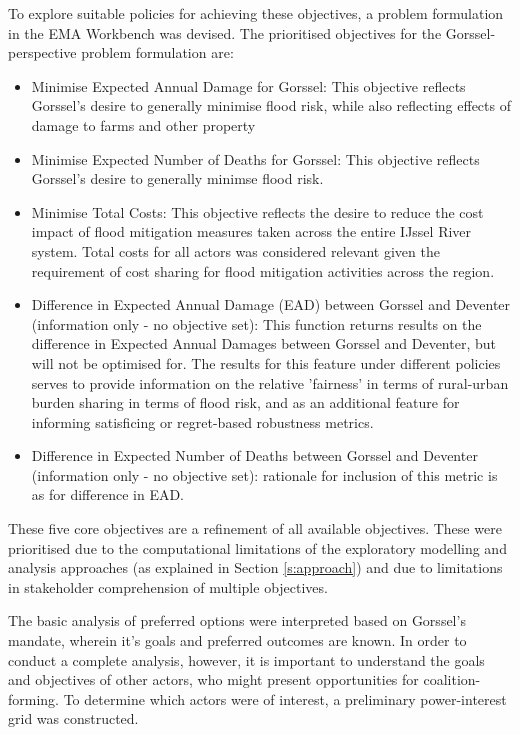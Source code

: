 To explore suitable policies for achieving these objectives, a problem formulation in the EMA Workbench was devised.
The prioritised objectives for the Gorssel-perspective problem formulation are:
\begin{itemize}
    \item Minimise Expected Annual Damage for Gorssel: This objective reflects Gorssel's desire to generally minimise flood risk, while also reflecting effects of damage to farms and other property
    \item Minimise Expected Number of Deaths for Gorssel: This objective reflects Gorssel's desire to generally minimse flood risk.
    \item Minimise Total Costs: This objective reflects the desire to reduce the cost impact of flood mitigation measures taken across the entire IJssel River system. Total costs for all actors was considered relevant given the requirement of cost sharing for flood mitigation activities across the region.
    \item Difference in Expected Annual Damage (EAD) between Gorssel and Deventer (information only - no objective set): This function returns results on the difference in Expected Annual Damages between Gorssel and Deventer, but will not be optimised for. The results for this feature under different policies serves to provide information on the relative 'fairness' in terms of rural-urban burden sharing in terms of flood risk, and as an additional feature for informing satisficing or regret-based robustness metrics.
    \item Difference in Expected Number of Deaths between Gorssel and Deventer (information only - no objective set): rationale for inclusion of this metric is as for difference in EAD.
\end{itemize}
These five core objectives are a refinement of all available objectives. These were prioritised due to the computational limitations of the exploratory modelling and analysis approaches (as explained in Section \ref{s:approach}) and due to limitations in stakeholder comprehension of multiple objectives.


The basic analysis of preferred options were interpreted based on Gorssel's mandate, wherein it's goals and preferred outcomes are known. In order to conduct a complete analysis, however, it is important to understand the goals and objectives of other actors, who might present opportunities for coalition-forming. To determine which actors were of interest, a preliminary power-interest grid was constructed.






